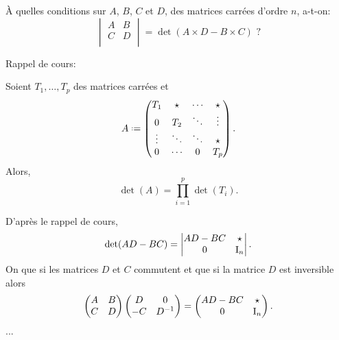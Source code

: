 \begin{exercice} 
À quelles conditions sur $A$, $B$, $C$ et $D$, des matrices carrées d'ordre $n$, a-t-on:
    $$
        \begin{vmatrix}
            A & B\\
            C & D\\
        \end{vmatrix} = \det(A \times D - B \times C) \text{ ?}
    $$ 
\end{exercice}
 
Rappel de cours:

\begin{prop}{}
    Soient $T_1, \dots, T_p$ des matrices carrées et 
    $$A \defeq
    \begin{pmatrix}
        T_1 & \star & \cdots & \star \\
        0 & T_2 & \ddots & \vdots \\
        \vdots & \ddots & \ddots & \star \\
        0 & \cdots & 0 & T_p
    \end{pmatrix}.
    $$
    Alors, 
    $$\det(A) = \prod_{i=1}^p \det(T_i).$$
\end{prop}

\begin{solution}
    D'après le rappel de cours, 
    $$\det(AD - BC) = \begin{vmatrix}
        AD - BC & \star \\
        0 & \mathrm{I}_n
    \end{vmatrix}.$$ 
    On  que si les matrices $D$ et $C$ commutent et que si la matrice $D$ est inversible alors
    $$
    \begin{pmatrix}
        A & B \\
        C & D
    \end{pmatrix}
    \begin{pmatrix}
        D & 0 \\
        -C & D^{-1}
    \end{pmatrix}
     = \begin{pmatrix}
         AD-BC & \star \\
         0 & \mathrm{I}_n
     \end{pmatrix}.
    $$
    ...
\end{solution}